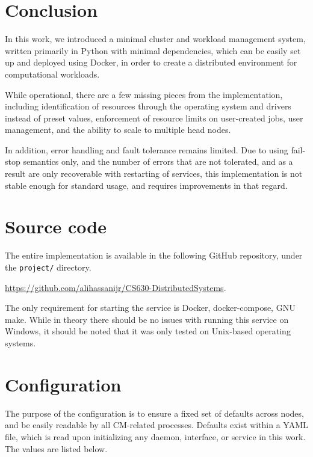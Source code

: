 \documentclass[sigconf]{acmart}
\begin{document}
\section{Conclusion}
In this work, we introduced a minimal cluster and workload management system, written primarily in Python with minimal
dependencies, which can be easily set up and deployed using Docker, in order to create a distributed environment for
computational workloads.

While operational, there are a few missing pieces from the implementation, including identification of resources through the
operating system and drivers instead of preset values, enforcement of resource limits on user-created jobs, user management, and
the ability to scale to multiple head nodes.

In addition, error handling and fault tolerance remains limited. Due to using fail-stop semantics only, and the number of
errors that are not tolerated, and as a result are only recoverable with restarting of services, this implementation is not
stable enough for standard usage, and requires improvements in that regard.





\clearpage

\appendix

\section{Source code}
\label{supp:sourcecode}
The entire implementation is available in the following GitHub repository, under the \verb|project/| directory.

\url{https://github.com/alihassanijr/CS630-DistributedSystems}.

The only requirement for starting the service is Docker, docker-compose, GNU make.
While in theory there should be no issues with running this service on Windows, it should be noted that it was only tested on 
Unix-based operating systems.

\section{Configuration}
\label{supp:configurations}
The purpose of the configuration is to ensure a fixed set of defaults across nodes, and be easily readable by all CM-related
processes. Defaults exist within a YAML file, which is read upon initializing any daemon, interface, or service in this work.
The values are listed below.
\end{document}
